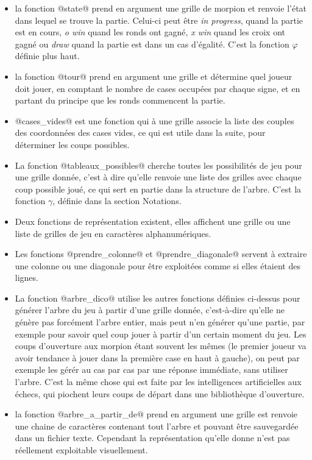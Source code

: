 \documentclass{article}
\begin{document}
\begin{itemize}

\item la fonction @state@ prend en argument une grille de morpion et renvoie l'état dans lequel se trouve la partie. Celui-ci peut être \emph{in progress}, quand la partie est en cours, \emph{o win} quand les ronds ont gagné, \emph{x win} quand les croix ont gagné ou \emph{draw} quand la partie est dans un cas d'égalité. C'est la fonction $\varphi$ définie plus haut.

\item la fonction @tour@ prend en argument une grille et détermine quel joueur doit jouer, en comptant le nombre de cases occupées par chaque signe, et en partant du principe que les ronds commencent la partie. 

\item @cases_vides@ est une fonction qui à une grille associe la liste des couples des coordonnées des cases vides, ce qui est utile dans la suite, pour déterminer les coups possibles. 

\item La fonction @tableaux_possibles@ cherche toutes les possibilités de jeu pour une grille donnée, c'est à dire qu'elle renvoie une liste des grilles avec chaque coup possible joué, ce qui sert en partie dans la structure de l'arbre. C'est la fonction $\gamma$, définie dans la section Notations.

\item Deux fonctions de représentation existent, elles affichent une grille ou une liste de grilles de jeu en caractères alphanumériques.

\item Les fonctions @prendre_colonne@ et @prendre_diagonale@ servent à extraire une colonne ou une diagonale pour être exploitées comme si elles étaient des lignes.

\item La fonction @arbre_dico@ utilise les autres fonctions définies ci-dessus pour générer l'arbre du jeu à partir d'une grille donnée, c'est-à-dire qu'elle ne génère pas forcément l'arbre entier, mais peut n'en générer qu'une partie, par exemple pour savoir quel coup jouer à partir d'un certain moment du jeu. Les coups d'ouverture aux morpion étant souvent les mêmes (le premier joueur va avoir tendance à jouer dans la première case en haut à gauche), on peut par exemple les gérér au cas par cas par une réponse immédiate, sans utiliser l'arbre. C'est la même chose qui est faite par les intelligences artificielles aux échecs, qui piochent leurs coups de départ dans une bibliothèque d'ouverture.

\item la fonction @arbre_a_partir_de@ prend en argument une grille est renvoie une chaine de caractères contenant tout l'arbre et pouvant être sauvegardée dans un fichier texte. Cependant la représentation qu'elle donne n'est pas réellement exploitable visuellement.

\end{itemize}
\end{document}
